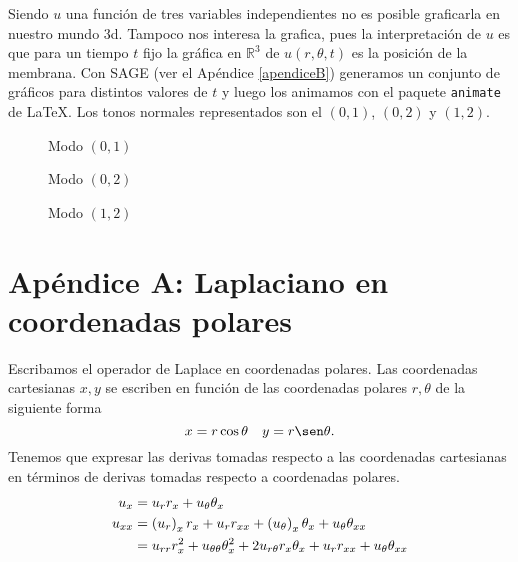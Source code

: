 
Siendo $u$ una función de tres variables independientes no es posible graficarla en nuestro mundo 3d. Tampoco nos interesa la grafica, pues la interpretación de $u$ es que para un tiempo $t$ fijo la gráfica en $\mathbb{R}^3$ de  $u(r,\theta,t)$ es la posición de la membrana.  Con SAGE (ver el Apéndice \ref{apendiceB}) generamos un conjunto de gráficos para distintos valores de $t$ y luego los animamos con el paquete \texttt{animate} de \LaTeX. Los tonos normales representados son el $(0,1)$, $(0,2)$ y $(1,2)$.

\begin{figure}[h]
  \begin{center}
\end{center} 
\caption{Modo $(0,1)$}
\end{figure}


  \begin{figure}
 \begin{center}
\end{center}  
\caption{Modo $(0,2)$}
\end{figure}

    \begin{figure}
 \begin{center}
\end{center}  
\caption{Modo $(1,2)$}
\end{figure}

\newpage
\section{Apéndice A: Laplaciano en coordenadas polares}\label{eq:apendice}
Escribamos el operador de Laplace en coordenadas polares. Las coordenadas cartesianas  $x,y$ se escriben en función de las coordenadas polares $r,\theta$ de la siguiente forma
\[x=r\cos\theta\quad y=r\sen\theta.\]
Tenemos que expresar las derivas tomadas respecto a las coordenadas cartesianas en términos de derivas tomadas respecto a coordenadas polares.  
\begin{align}
  u_x&=u_rr_x+u_{\theta}\theta_x\notag\\
  u_{xx}&=\left(u_r\right)_xr_x+u_rr_{xx}+\left(u_{\theta}\right)_x\theta_x+u_{\theta}\theta_{xx}\notag\\
&=u_{rr}r_x^2+u_{\theta\theta}\theta_x^2+2u_{r\theta}r_x\theta_x+u_rr_{xx}+u_{\theta}\theta_{xx}\label{eq:lapla_pol}
\end{align}

